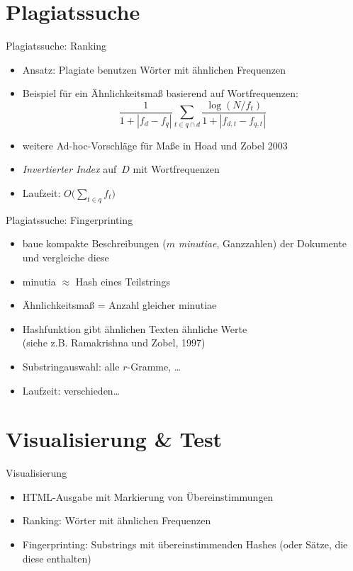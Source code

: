 \documentclass[german,simple]{mybeamer}
\begin{document}
\section{Plagiatssuche}

\begin{frame}{Plagiatssuche: Ranking}
  \begin{itemize}
      \item Ansatz: Plagiate benutzen Wörter mit ähnlichen Frequenzen
      \item Beispiel für ein Ähnlichkeitsmaß basierend auf Wortfrequenzen:
      \[ \frac{1}{1+|f_d - f_q|}\sum_{t\in q\cap d} \frac{\log(N/f_t)}{1+|f_{d,t}-f_{q,t}|} \]
      \item weitere Ad-hoc-Vorschläge für Maße in Hoad und Zobel 2003
      \item \emph{Invertierter Index} auf~$D$ mit Wortfrequenzen
      \item Laufzeit: $O\bigl(\sum_{t\in q} f_t\bigr)$
  \end{itemize}
\end{frame}

\begin{frame}{Plagiatssuche: Fingerprinting}
  \begin{itemize}
    \item baue kompakte Beschreibungen ($m$ \emph{minutiae}, Ganzzahlen) der Dokumente
    und vergleiche diese
    \item minutia $\approx$ Hash eines Teilstrings
    \item Ähnlichkeitsmaß = Anzahl gleicher minutiae
    \item Hashfunktion gibt ähnlichen Texten ähnliche Werte\\
    (siehe z.B. Ramakrishna und Zobel, 1997)
    \item Substringauswahl: alle $r$-Gramme, \dots
    \item Laufzeit: verschieden\dots %
  \end{itemize}
\end{frame}

\section{Visualisierung \& Test}

\begin{frame}{Visualisierung}
  \begin{itemize}
    \item HTML-Ausgabe mit Markierung von Übereinstimmungen
    \item Ranking: Wörter mit ähnlichen Frequenzen
    \item Fingerprinting: Substrings mit übereinstimmenden Hashes (oder Sätze, die diese enthalten)
  \end{itemize}
\end{frame}
\end{document}
